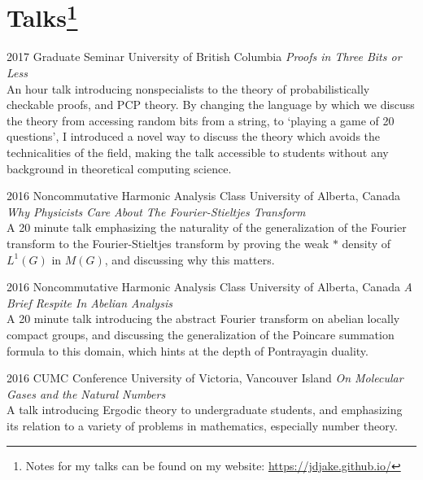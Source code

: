 \documentclass{friggeri-cv} %
\begin{document}

\pagebreak[3]
\section{Talks\footnote{Notes for my talks can be found on my website: \href{https://jdjake.github.io/}{https://jdjake.github.io/}}} %

\begin{entrylist}
  

\entry
{2017}
{Graduate Seminar}
{University of British Columbia}
{\emph{Proofs in Three Bits or Less}\\
An hour talk introducing nonspecialists to the theory of probabilistically checkable proofs, and PCP theory. By changing the language by which we discuss the theory from accessing random bits from a string, to `playing a game of 20 questions', I introduced a novel way to discuss the theory which avoids the technicalities of the field, making the talk accessible to students without any background in theoretical computing science.}



\entry
{2016}
{Noncommutative Harmonic Analysis Class}
{University of Alberta, Canada}
{\emph{Why Physicists Care About The Fourier-Stieltjes Transform}\\
A 20 minute talk emphasizing the naturality of the generalization of the Fourier transform to the Fourier-Stieltjes transform by proving the weak $*$ density of $L^1(G)$ in $M(G)$, and discussing why this matters.}

\entry
{2016}
{Noncommutative Harmonic Analysis Class}
{University of Alberta, Canada}
{\emph{A Brief Respite In Abelian Analysis}\\
A 20 minute talk introducing the abstract Fourier transform on abelian locally compact groups, and discussing the generalization of the Poincare summation formula to this domain, which hints at the depth of Pontrayagin duality.}


\entry
{2016}
{CUMC Conference}
{University of Victoria, Vancouver Island}
{\emph{On Molecular Gases and the Natural Numbers}\\
A talk introducing Ergodic theory to undergraduate students, and emphasizing its relation to a variety of problems in mathematics, especially number theory.}


\end{entrylist}
\end{document}
